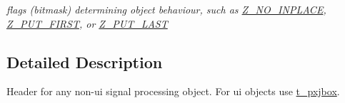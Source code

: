 \begin{DoxyCompactItemize}
\begin{DoxyCompactList}\small\item\em flags (bitmask) determining object behaviour, such as \hyperlink{group__msp_ga15695d5ba6bd17ae2e4ac01fff6d2b32}{Z\_\-NO\_\-INPLACE}, \hyperlink{group__msp_gafd451e217e2ffd6b8e158b8861fcf866}{Z\_\-PUT\_\-FIRST}, or \hyperlink{group__msp_ga38363d9e8d77f8f0fcec1a7a1d008977}{Z\_\-PUT\_\-LAST} \item\end{DoxyCompactList}\end{DoxyCompactItemize}


\subsection{Detailed Description}
Header for any non-\/ui signal processing object. For ui objects use \hyperlink{structt__pxjbox}{t\_\-pxjbox}. 